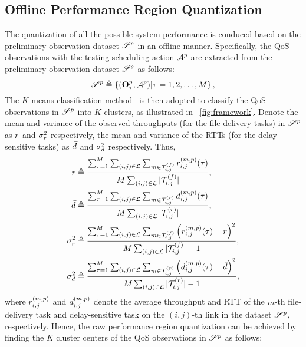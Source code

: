 \subsection{Offline Performance Region Quantization}
\label{sec:performance Region Quantization}
The quantization of all the possible system performance is conduced based on the preliminary observation dataset $\mathscr{S}^{s}$ in an offline manner. Specifically, the QoS observations with the testing scheduling action $\mathcal{A}^{p}$ are extracted from the preliminary observation dataset $\mathscr{S}^{s}$ as follows:
\begin{equation}
   \mathscr{S}^{p} \triangleq
   \left\{
   (\mathbf{O}^{p}_\tau, \mathcal{A}^{p}) | \tau = 1, 2, \ldots, M
   \right\},
\end{equation}
The $K$-means classification method~\cite{macqueen1967some} is then adopted to classify the QoS observations in $\mathscr{S}^{p}$ into $K$ clusters, as illustrated in \figurename~\ref{fig:framework}. Denote the mean and variance of the observed throughputs (for the file delivery tasks) in $\mathscr{S}^{p}$ as $\bar{r}$ and $\sigma_{r}^2$ respectively, the mean and variance of the RTTs (for the delay-sensitive tasks) as {$\bar{d}$ and $\sigma_{d}^2$} respectively. Thus,
\begin{align}
   \bar{r} & \triangleq
   \frac{
      \sum_{\tau = 1}^M \sum_{(i,j) \in{\mathcal{L}}} \sum_{{m} \in{\mathcal{T}_{i,j}^{(f)}}} r_{i,j}^{(m,p)}(\tau)
   }{
      M \sum_{(i,j) \in{\mathcal{L}}} |\mathcal{T}_{i,j}^{(f)}|
   },                    \\
   \bar{d}  & \triangleq
   \frac{
      \sum_{\tau = 1}^M  \sum_{(i,j) \in{\mathcal{L}}} \sum_{{m} \in{\mathcal{T}_{i,j}^{(r)}}} d_{i,j}^{(m,p)}(\tau)
   }{
      M  \sum_{(i,j) \in{\mathcal{L}}} |\mathcal{T}_{i,j}^{(r)}|
   },                    \\
   \sigma_{r}^2 & \triangleq
      \frac{
         \sum_{\tau = 1}^M  \sum_{(i,j) \in{\mathcal{L}}} \sum_{{m} \in{\mathcal{T}_{i,j}^{(f)}}}
         {\left(r_{i,j}^{(m,p)}(\tau) - \bar{r}\right)}^2
      }{
         M  \sum_{(i,j) \in{\mathcal{L}}} |\mathcal{T}_{i,j}^{(f)}| - 1
      },                    \\
   \sigma_{d}^2  & \triangleq
      \frac{
         \sum_{\tau = 1}^M  \sum_{(i,j) \in{\mathcal{L}}} \sum_{{m} \in{\mathcal{T}_{i,j}^{(r)}}}
         {\left(d_{i,j}^{(m,p)}(\tau) - \bar{d}\right)}^2
      }{
         M  \sum_{(i,j) \in{\mathcal{L}}} |\mathcal{T}_{i,j}^{(r)}| - 1
      },
\end{align}
where $r_{i,j}^{(m,p)}$ and $d_{i,j}^{(m,p)}$ denote the average throughput and RTT of the $m$-th file-delivery task and delay-sensitive task on the $(i,j)$-th link in the dataset $\mathscr{S}^{p}$, respectively. Hence, the raw performance region quantization can be achieved by finding the $K$ cluster centers of the QoS observations in $\mathscr{S}^{p}$ as follows:
